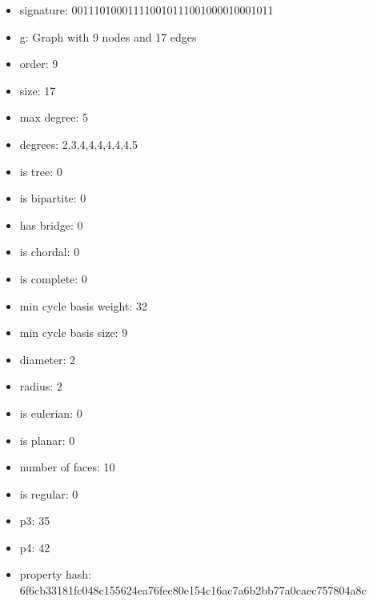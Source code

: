 \newpage
\begin{figure}
\end{figure}
\begin{itemize}
\item signature: 001110100011110010111001000010001011
\item g: Graph with 9 nodes and 17 edges
\item order: 9
\item size: 17
\item max degree: 5
\item degrees: 2,3,4,4,4,4,4,4,5
\item is tree: 0
\item is bipartite: 0
\item has bridge: 0
\item is chordal: 0
\item is complete: 0
\item min cycle basis weight: 32
\item min cycle basis size: 9
\item diameter: 2
\item radius: 2
\item is eulerian: 0
\item is planar: 0
\item number of faces: 10
\item is regular: 0
\item p3: 35
\item p4: 42
\item property hash: 6f6cb33181fc048c155624ea76fec80e154c16ac7a6b2bb77a0caec757804a8c
\end{itemize}

